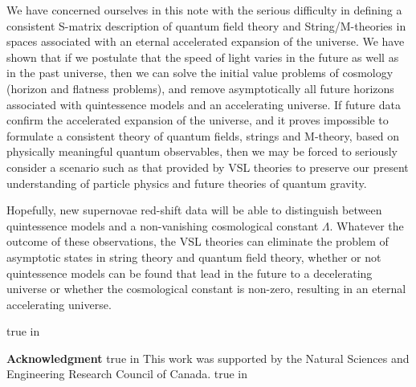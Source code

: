 \documentclass[a4paper,12pt]{article}
\begin{document}
We have concerned ourselves in this note with the serious difficulty in
defining a consistent S-matrix description of quantum field theory and
String/M-theories in spaces
associated with an eternal accelerated expansion of the universe. We have
shown that if we postulate that the speed of light varies in the future as
well as in the past universe, then we can solve the initial value problems
of cosmology (horizon and flatness problems), and remove asymptotically all
future horizons associated with quintessence models and an accelerating
universe. If future data confirm the accelerated expansion of the universe,
and it proves impossible to formulate a consistent theory of quantum
fields, strings and M-theory, based on physically meaningful quantum
observables, then we may be forced to seriously consider a scenario such as
that provided by VSL theories to preserve our present understanding of
particle physics and future theories of quantum gravity.

Hopefully, new supernovae red-shift data will be able to distinguish
between quintessence models and a non-vanishing cosmological constant
$\Lambda$. Whatever the outcome of these observations, the VSL
theories can eliminate the problem of asymptotic states in string
theory and quantum field theory, whether or not quintessence models can be
found that lead in the future to a decelerating universe or whether the
cosmological constant is non-zero, resulting in an eternal accelerating
universe.

 true in

{\bf Acknowledgment}
 true in
This work was supported by the Natural Sciences and Engineering Research
Council of Canada.
 true in
\end{document}

